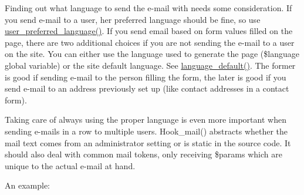 Finding out what language to send the e-\/mail with needs some consideration. If you send e-\/mail to a user, her preferred language should be fine, so use \hyperlink{user_8module_a0122ed84b87c9b23dbd3be7ff563bc49}{user\_\-preferred\_\-language()}. If you send email based on form values filled on the page, there are two additional choices if you are not sending the e-\/mail to a user on the site. You can either use the language used to generate the page (\$language global variable) or the site default language. See \hyperlink{bootstrap_8inc_a336c0878074791056c62640cd95d8067}{language\_\-default()}. The former is good if sending e-\/mail to the person filling the form, the later is good if you send e-\/mail to an address previously set up (like contact addresses in a contact form).

Taking care of always using the proper language is even more important when sending e-\/mails in a row to multiple users. Hook\_\-mail() abstracts whether the mail text comes from an administrator setting or is static in the source code. It should also deal with common mail tokens, only receiving \$params which are unique to the actual e-\/mail at hand.

An example:




